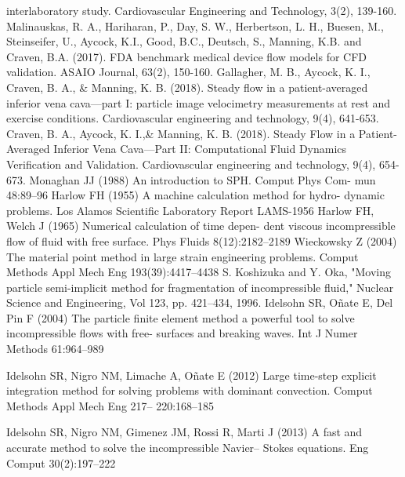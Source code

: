 interlaboratory study. Cardiovascular Engineering and Technology, 3(2), 139-160.
 Malinauskas, R. A., Hariharan, P., Day, S. W., Herbertson, L. H., Buesen, M., Steinseifer, U., Aycock, K.I., Good, B.C., Deutsch,
S., Manning, K.B. and Craven, B.A. (2017). FDA benchmark medical device flow models for CFD validation. ASAIO Journal,
63(2), 150-160.
 Gallagher, M. B., Aycock, K. I., Craven, B. A., \& Manning, K. B. (2018). Steady flow in a patient-averaged inferior vena cava—part I: particle image velocimetry measurements at rest and exercise conditions. Cardiovascular engineering and technology, 9(4), 641-653.
 Craven, B. A., Aycock, K. I.,\& Manning, K. B. (2018). Steady Flow in a Patient-Averaged Inferior Vena Cava—Part II: Computational Fluid Dynamics Verification and Validation. Cardiovascular engineering and technology, 9(4), 654-673.
 Monaghan JJ (1988) An introduction to SPH. Comput Phys Com-
mun 48:89–96
 Harlow FH (1955) A machine calculation method for hydro-
dynamic problems. Los Alamos Scientific Laboratory Report
LAMS-1956
 Harlow FH, Welch J (1965) Numerical calculation of time depen-
dent viscous incompressible flow of fluid with free surface. Phys
Fluids 8(12):2182–2189
 Wieckowsky Z (2004) The material point method in large
strain engineering problems. Comput Methods Appl Mech Eng
193(39):4417–4438
S. Koshizuka and Y. Oka, "Moving particle semi-implicit method for fragmentation of incompressible fluid," Nuclear Science and Engineering, Vol 123, pp. 421–434, 1996.
 Idelsohn SR, Oñate E, Del Pin F (2004) The particle finite element
method a powerful tool to solve incompressible flows with free-
surfaces and breaking waves. Int J Numer Methods 61:964–989

 Idelsohn SR, Nigro NM, Limache A, Oñate E (2012) Large
time-step explicit integration method for solving problems with
dominant convection. Comput Methods Appl Mech Eng 217–
220:168–185

 Idelsohn SR, Nigro NM, Gimenez JM, Rossi R, Marti J (2013)
A fast and accurate method to solve the incompressible Navier–
Stokes equations. Eng Comput 30(2):197–222

